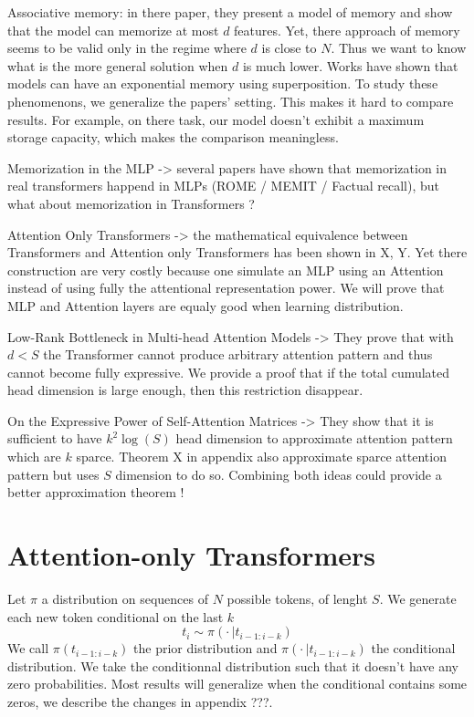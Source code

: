 \documentclass{article}
\begin{document}
Associative memory: in there paper, they present a model of memory and show that the model can memorize at most $d$ features. 
Yet, there approach of memory seems to be valid only in the regime where $d$ is close to $N$. Thus we want to know what is the more general
solution when $d$ is much lower. Works have shown that models can have an exponential memory using superposition. 
To study these phenomenons, we generalize the papers' setting. This makes it hard to compare results.
For example, on there task, our model doesn't exhibit a maximum storage capacity, which makes the comparison meaningless. 
\bigbreak

Memorization in the MLP -> several papers have shown that memorization in real transformers happend in MLPs (ROME / MEMIT / Factual recall), 
but what about memorization in Transformers ? 
\bigbreak

Attention Only Transformers -> the mathematical equivalence between Transformers and Attention only Transformers has been shown in X, Y.
Yet there construction are very costly because one simulate an MLP using an Attention instead of using fully the attentional representation
power. We will prove that MLP and Attention layers are equaly good when learning distribution.
\bigbreak

Low-Rank Bottleneck in Multi-head Attention Models -> They prove that with $d<S$ the Transformer cannot produce arbitrary attention pattern
and thus cannot become fully expressive. We provide a proof that if the total cumulated head dimension is large enough, then this 
restriction disappear.
\bigbreak

On the Expressive Power of Self-Attention Matrices -> They show that it is sufficient to have $k^2\log(S)$ head dimension to approximate
attention pattern which are $k$ sparce. Theorem X in appendix also approximate sparce attention pattern but uses $S$ dimension to do so.
Combining both ideas could provide a better approximation theorem !
\bigbreak

\section{Attention-only Transformers}

Let $\pi$ a distribution on sequences of $N$ possible tokens, of lenght $S$. We generate each new token conditional on the 
last $k$ \[t_{i}\sim \pi(\cdot\,|t_{i-1:i-k})\] We call $\pi(t_{i-1:i-k})$ the prior distribution and 
$\pi(\cdot\,|t_{i-1:i-k})$ the conditional distribution. We take the conditionnal distribution such that it doesn't have any zero 
probabilities. Most results will generalize when the conditional contains some zeros, we describe the changes in appendix ???.
\bigbreak
\end{document}
